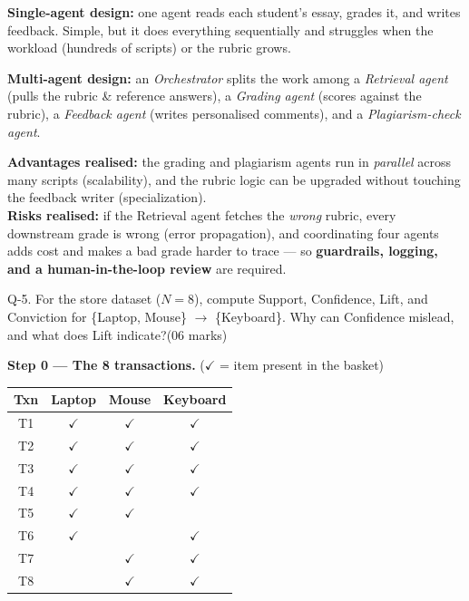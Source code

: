 \documentclass[11pt,a4paper]{article}
\newcommand{\question}[3][05 marks]{%
  \begin{qbox}#2\hfill\textcolor{accent}{(#1)}\\[2pt]#3\end{qbox}%
}
\begin{document}
\begin{definitionbox}
\textbf{Single-agent design:} one agent reads each student's essay, grades it, and writes feedback. Simple, but it does everything sequentially and struggles when the workload (hundreds of scripts) or the rubric grows.

\smallskip
\textbf{Multi-agent design:} an \emph{Orchestrator} splits the work among a \emph{Retrieval agent} (pulls the rubric \& reference answers), a \emph{Grading agent} (scores against the rubric), a \emph{Feedback agent} (writes personalised comments), and a \emph{Plagiarism-check agent}.

\smallskip
\textbf{Advantages realised:} the grading and plagiarism agents run in \emph{parallel} across many scripts (scalability), and the rubric logic can be upgraded without touching the feedback writer (specialization).\\
\textbf{Risks realised:} if the Retrieval agent fetches the \emph{wrong} rubric, every downstream grade is wrong (error propagation), and coordinating four agents adds cost and makes a bad grade harder to trace --- so \textbf{guardrails, logging, and a human-in-the-loop review} are required.
\end{definitionbox}

\question[06 marks]{Q-5. For the store dataset ($N=8$), compute Support, Confidence, Lift, and Conviction for \{Laptop, Mouse\} $\rightarrow$ \{Keyboard\}. Why can Confidence mislead, and what does Lift indicate?}{}

\textbf{Step 0 --- The 8 transactions.} ($\checkmark$ = item present in the basket)

\begin{center}
\begin{tabular}{@{}c ccc @{}}
\toprule
\rowcolor{primary!15}
\textbf{Txn} & \textbf{Laptop} & \textbf{Mouse} & \textbf{Keyboard} \\
\midrule
T1 & $\checkmark$ & $\checkmark$ & $\checkmark$ \\
T2 & $\checkmark$ & $\checkmark$ & $\checkmark$ \\
T3 & $\checkmark$ & $\checkmark$ & $\checkmark$ \\
T4 & $\checkmark$ & $\checkmark$ & $\checkmark$ \\
T5 & $\checkmark$ & $\checkmark$ & \\
T6 & $\checkmark$ &            & $\checkmark$ \\
T7 &            & $\checkmark$ & $\checkmark$ \\
T8 &            & $\checkmark$ & $\checkmark$ \\
\bottomrule
\end{tabular}
\end{center}
\end{document}

